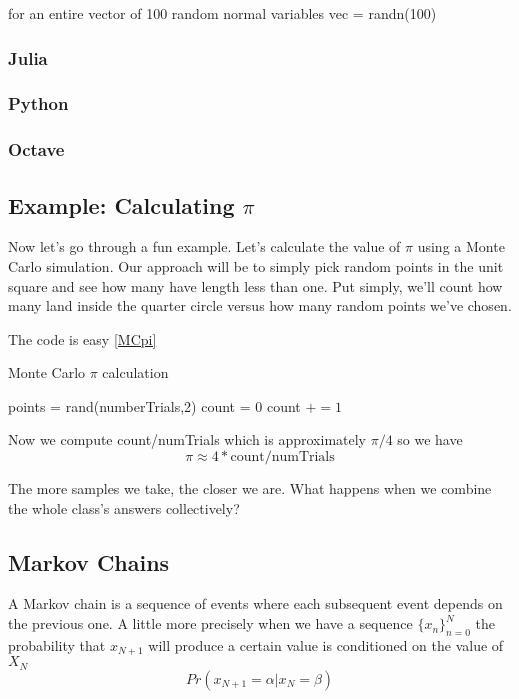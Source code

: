 \documentclass{article}
\theoremstyle{definition}
\theoremstyle{remark}
\begin{document}
for an entire vector of 100 random normal variables
vec = randn(100)

\subsubsection{Julia}

\subsubsection{Python}

\subsubsection{Octave}


\subsection{Example: Calculating $\pi$}

Now let's go through a fun example.  Let's calculate the value of $\pi$ using a Monte Carlo simulation.  Our approach will be to simply pick random points in the unit square and see how many have length less than one.
Put simply, we'll count how many land inside the quarter circle versus how many random points we've chosen.


The code is easy \ref{MCpi}
\begin{algorithm}
	\caption{Monte Carlo $\pi$ calculation}
	\label{MCpi}
	\begin{algorithmic}[1]
		\State points = rand(numberTrials,2)
		\State count = 0
		\State count $+= 1$
		\EndIf
		\EndFor
		\EndProcedure
	\end{algorithmic}	
\end{algorithm}   

Now we compute count/numTrials which is approximately $\pi/4$ so we have
\[
 \pi \approx 4*\text{count}/\text{numTrials} 
\]

The more samples we take, the closer we are.  What happens when we combine the whole class's answers collectively?

\subsection{Markov Chains}

A Markov chain is a sequence of events where each subsequent event depends on the previous one.  A little more precisely when we have a sequence $\{x_n\}_{n=0}^{N}$ the probability that $x_{N+1}$ will produce a certain value is conditioned on the value of $X_N$
\[
Pr(x_{N+1} =  \alpha | x_N = \beta)
\]
\end{document}
